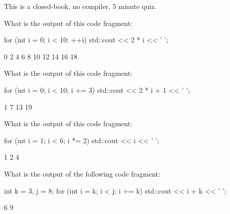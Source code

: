 

This is a closed-book, no compiler, 5 minute quiz.

\nextq
What is the output of this code fragment:
\begin{console}[fontsize=\footnotesize]
for (int i = 0; i < 10; ++i)
{
    std::cout << 2 * i << ' ';
}
\end{console}
\ANSWER
\begin{answercode}
0 2 4 6 8 10 12 14 16 18 
\end{answercode}

\nextq
What is the output of this code fragment:
\begin{console}[fontsize=\footnotesize]
for (int i = 0; i < 10; i += 3)
{
    std::cout << 2 * i + 1 << ' ';
}
\end{console}
\ANSWER
\begin{answercode}
1 7 13 19 
\end{answercode}

\nextq
What is the output of this code fragment:
\begin{console}[fontsize=\footnotesize]
for (int i = 1; i < 6; i *= 2)
{
    std::cout << i << ' ';
}
\end{console}
\ANSWER
\begin{answercode}
1 2 4 
\end{answercode}

\nextq
What is the output of the following code fragment:
\begin{console}[fontsize=\footnotesize]
int k = 3, j = 8;
for (int i = k; i < j; i += k)
{
    std::cout << i + k << ' ';
}
\end{console}
\ANSWER
\begin{answercode}
6 9  
\end{answercode}


